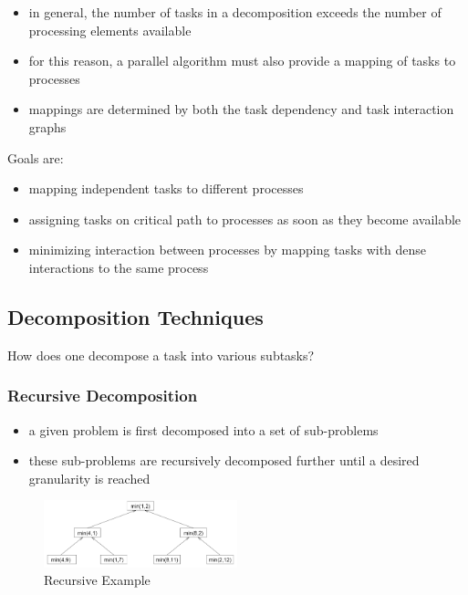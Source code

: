 \begin{itemize}
\tightlist
\item
  in general, the number of tasks in a decomposition exceeds the number
  of processing elements available
\item
  for this reason, a parallel algorithm must also provide a mapping of
  tasks to processes
\item
  mappings are determined by both the task dependency and task
  interaction graphs
\end{itemize}

Goals are:

\begin{itemize}
\tightlist
\item
  mapping independent tasks to different processes
\item
  assigning tasks on critical path to processes as soon as they become
  available
\item
  minimizing interaction between processes by mapping tasks with dense
  interactions to the same process
\end{itemize}

\hypertarget{decomposition-techniques}{%
\subsection{Decomposition Techniques}\label{decomposition-techniques}}

How does one decompose a task into various subtasks?

\hypertarget{recursive-decomposition}{%
\subsubsection{Recursive Decomposition}\label{recursive-decomposition}}

\begin{itemize}
\tightlist
\item
  a given problem is first decomposed into a set of sub-problems
\item
  these sub-problems are recursively decomposed further until a desired
  granularity is reached
\end{itemize}

\begin{figure}[H]
\centering
\includegraphics[width=0.5\textwidth]{figures/recursiveExample.png}
\caption{Recursive Example}
\end{figure}

